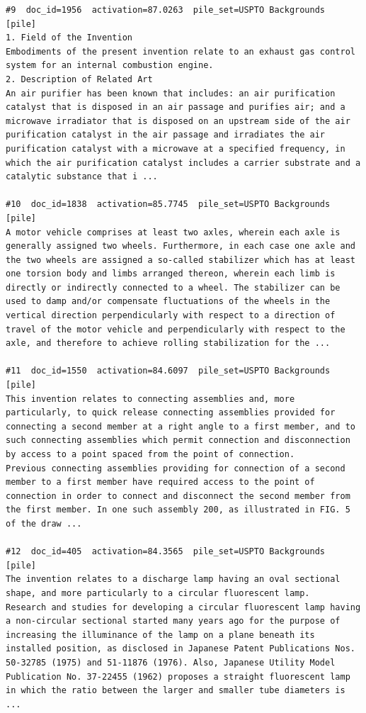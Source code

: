 \begin{verbatim}
#9  doc_id=1956  activation=87.0263  pile_set=USPTO Backgrounds  [pile]
1. Field of the Invention
Embodiments of the present invention relate to an exhaust gas control system for an internal combustion engine.
2. Description of Related Art
An air purifier has been known that includes: an air purification catalyst that is disposed in an air passage and purifies air; and a microwave irradiator that is disposed on an upstream side of the air purification catalyst in the air passage and irradiates the air purification catalyst with a microwave at a specified frequency, in which the air purification catalyst includes a carrier substrate and a catalytic substance that i ...

#10  doc_id=1838  activation=85.7745  pile_set=USPTO Backgrounds  [pile]
A motor vehicle comprises at least two axles, wherein each axle is generally assigned two wheels. Furthermore, in each case one axle and the two wheels are assigned a so-called stabilizer which has at least one torsion body and limbs arranged thereon, wherein each limb is directly or indirectly connected to a wheel. The stabilizer can be used to damp and/or compensate fluctuations of the wheels in the vertical direction perpendicularly with respect to a direction of travel of the motor vehicle and perpendicularly with respect to the axle, and therefore to achieve rolling stabilization for the ...

#11  doc_id=1550  activation=84.6097  pile_set=USPTO Backgrounds  [pile]
This invention relates to connecting assemblies and, more particularly, to quick release connecting assemblies provided for connecting a second member at a right angle to a first member, and to such connecting assemblies which permit connection and disconnection by access to a point spaced from the point of connection.
Previous connecting assemblies providing for connection of a second member to a first member have required access to the point of connection in order to connect and disconnect the second member from the first member. In one such assembly 200, as illustrated in FIG. 5 of the draw ...

#12  doc_id=405  activation=84.3565  pile_set=USPTO Backgrounds  [pile]
The invention relates to a discharge lamp having an oval sectional shape, and more particularly to a circular fluorescent lamp.
Research and studies for developing a circular fluorescent lamp having a non-circular sectional started many years ago for the purpose of increasing the illuminance of the lamp on a plane beneath its installed position, as disclosed in Japanese Patent Publications Nos. 50-32785 (1975) and 51-11876 (1976). Also, Japanese Utility Model Publication No. 37-22455 (1962) proposes a straight fluorescent lamp in which the ratio between the larger and smaller tube diameters is ...


\end{verbatim}
